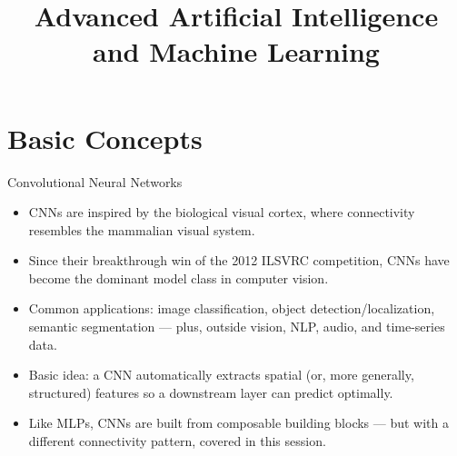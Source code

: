 




\newcommand{\titlefigure}{figure/cortex.png}
\newcommand{\learninggoals}{
  \item CNNs as a locally-connected, weight-sharing alternative to fully-connected networks, suited to spatial and sequential data
  \item The convolution operation as a learned local feature detector, generalized to 1D, 2D, and 3D data (time series, images, video/volumetric data)
  \item Padding, stride, and input channels, and how they determine output feature map size
  \item Sparse connectivity, parameter sharing, and translation equivariance as the properties that make convolutions efficient
  \item Dilated and transposed convolutions, pooling, and how these ideas culminate in modern architectures (residual/skip connections)
}

\title{Advanced Artificial Intelligence and Machine Learning}
\date{}




\section{Basic Concepts}

\begin{frame}{Convolutional Neural Networks}
\begin{itemize}
    \item CNNs are inspired by the biological visual cortex, where connectivity resembles the mammalian visual system.
    \item Since their breakthrough win of the 2012 ILSVRC competition, CNNs have become the dominant model class in computer vision.
    \item Common applications: image classification, object detection/localization, semantic segmentation --- plus, outside vision, NLP, audio, and time-series data.
    \item Basic idea: a CNN automatically extracts spatial (or, more generally, structured) features so a downstream layer can predict optimally.
    \item Like MLPs, CNNs are built from composable building blocks --- but with a different connectivity pattern, covered in this session.
\end{itemize}
\end{frame}

